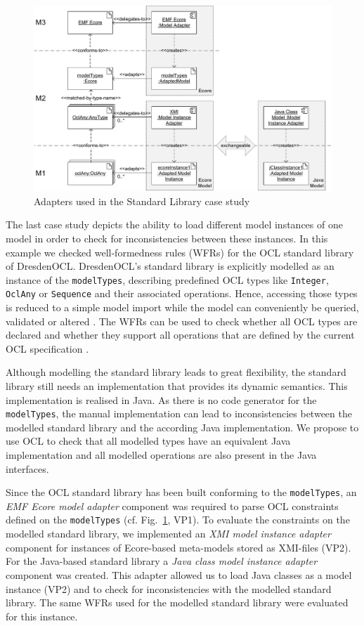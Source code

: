 \begin{figure}[!t]
	\centering
		\includegraphics[width=1.00\textwidth]{figures/casestudy03.pdf}
	\caption{Adapters used in the Standard Library case study}
	\label{fig:casestudy03}
\end{figure}

The last case study depicts the ability to load different model instances of one model 
in order to check for inconsistencies between these instances. In this example we 
checked well-formedness rules (WFRs) for the OCL standard library of DresdenOCL. 
DresdenOCL's standard library is explicitly modelled as 
an instance of the \texttt{model\-Types}, describing predefined OCL types like \texttt{Integer}, 
\texttt{OclAny} or \texttt{Sequence} and their associated operations. 
Hence, accessing those types is reduced to a simple model 
import while the model can conveniently be queried, validated or altered 
\cite{braeuerOCL07}. The WFRs can be used to check whether all OCL types are 
declared and whether they support all operations that are defined by the 
current OCL specification \cite{spec:OCL2-2}.

Although modelling the standard library leads to great flexibility, the standard library 
still needs an implementation that provides its dynamic semantics. 
This implementation is realised in Java. As there is no code generator for the \texttt{model\-Types}, 
the manual implementation can lead to inconsistencies between 
the modelled standard library and the according Java implementation.
We propose to use OCL to check that all modelled types have an equivalent Java 
implementation and all modelled operations are also present in the Java interfaces.

Since the OCL standard library has been built conforming to the \texttt{model\-Types}, an
\textit{EMF Ecore model adapter} component was required to parse OCL constraints
defined on the \texttt{model\-Types} (cf. Fig.~\ref{fig:casestudy03}, VP1).
To evaluate the constraints on the modelled standard library,
we implemented an \textit{XMI model instance adapter} component for instances of 
Ecore-based meta-models stored as XMI-files (VP2). For the Java-based standard library
a \emph{Java class model instance adapter} component was created. This adapter
allowed us to load Java classes as a model instance (VP2)
and to check for inconsistencies with the modelled standard library. The same WFRs 
used for the modelled standard library were evaluated for this instance. 

